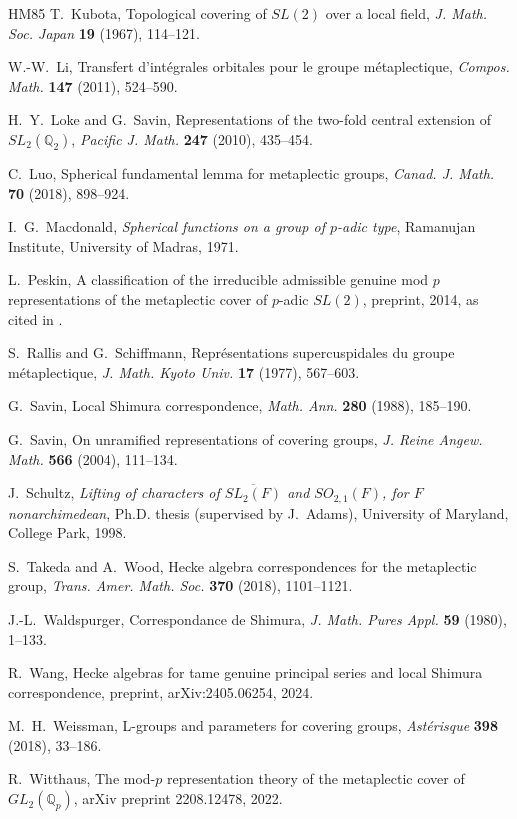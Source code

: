 \documentclass[12pt,letterpaper]{amsart}
\numberwithin{equation}{section}
\theoremstyle{definition}
\theoremstyle{remark}
\begin{document}
\begin{thebibliography}{HM85}
 T.~Kubota, Topological covering of $SL(2)$ over a
local field, \emph{J. Math. Soc. Japan} \textbf{19} (1967), 114--121.

 W.-W.~Li, Transfert d'int\'egrales orbitales pour le
groupe m\'etaplectique, \emph{Compos. Math.} \textbf{147} (2011),
524--590.

 H.~Y.~Loke and G.~Savin, Representations of the
two-fold central extension of $SL_2(\mathbb{Q}_2)$, \emph{Pacific J.
Math.} \textbf{247} (2010), 435--454.

 C.~Luo, Spherical fundamental lemma for metaplectic
groups, \emph{Canad. J. Math.} \textbf{70} (2018), 898--924.

 I.~G.~Macdonald, \emph{Spherical functions on a group
of $p$-adic type}, Ramanujan Institute, University of Madras, 1971.

 L.~Peskin, A classification of the irreducible
admissible genuine mod $p$ representations of the metaplectic cover of
$p$-adic $SL(2)$, preprint, 2014, as cited in \cite{Wi22}.

 S.~Rallis and G.~Schiffmann, Repr\'esentations
supercuspidales du groupe m\'etaplectique, \emph{J. Math. Kyoto Univ.}
\textbf{17} (1977), 567--603.

 G.~Savin, Local Shimura correspondence,
\emph{Math. Ann.} \textbf{280} (1988), 185--190.

 G.~Savin, On unramified representations of
covering groups, \emph{J. Reine Angew. Math.} \textbf{566} (2004),
111--134.

 J.~Schultz, \emph{Lifting of characters of
$\overline{SL_2(F)}$ and $SO_{2,1}(F)$, for $F$ nonarchimedean}, Ph.D.
thesis (supervised by J.~Adams), University of Maryland, College Park,
1998.

 S.~Takeda and A.~Wood, Hecke algebra
correspondences for the metaplectic group, \emph{Trans. Amer. Math.
Soc.} \textbf{370} (2018), 1101--1121.

 J.-L.~Waldspurger, Correspondance de Shimura,
\emph{J. Math. Pures Appl.} \textbf{59} (1980), 1--133.

 R.~Wang, Hecke algebras for tame genuine principal
series and local Shimura correspondence, preprint, arXiv:2405.06254,
2024.

 M.~H.~Weissman, L-groups and parameters for
covering groups, \emph{Ast\'erisque} \textbf{398} (2018), 33--186.

 R.~Witthaus, The mod-$p$ representation theory of
the metaplectic cover of $GL_2(\mathbb{Q}_p)$, arXiv preprint
2208.12478, 2022.

\end{thebibliography}
\end{document}
